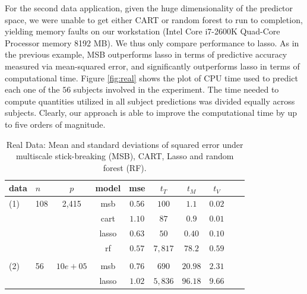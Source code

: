 \documentclass{article} %
\begin{document}
 For the second data application, given the huge dimensionality of the predictor space, we were unable to get either CART or random forest to run to completion, yielding memory faults on our workstation (Intel Core i7-2600K Quad-Core Processor memory 8192 MB).  We thus only compare performance to lasso.  As in the previous example, MSB outperforms lasso in terms of predictive accuracy measured via mean-squared error, and significantly outperforms lasso in terms of computational time.  
Figure \ref{fig:real} shows the plot of CPU time used to predict each one of the $56$ subjects involved in the experiment. The time needed to compute quantities utilized in all subject predictions was divided equally across subjects. Clearly, our approach is able to improve the computational time by up to five orders of magnitude. 


\begin{table}[t]
\caption{Real Data: Mean and standard deviations of squared error under multiscale stick-breaking (MSB), CART, Lasso and random forest (RF).}\label{real}
\vskip 0.15in
\begin{center}
\begin{small}
\begin{sc}
\begin{tabular}{llcccccccc}
\hline
data &$n$&$p$ &model&mse&$t_{T}$ & $t_{M}$ & $t_{V}$\\
\hline
(1)&108&2,415&msb &$0.56$ & $100$ & $1.1$& $0.02$\\
 &&& cart & $1.10$ & $87$ & $0.9$ &$0.01$\\
&&& lasso & $0.63$  & $50$ & $0.40$ & $0.10$\\
&&& rf & $0.57$ &  $7,817$ & $78.2$ & $0.59$\\
\\
  (2)&56&$10e+05$&msb &$0.76$ & $690$ & $20.98$& $2.31$\\
 &&& lasso & $1.02$  & $5,836$ & $96.18$ & $9.66$\\
\hline
\end{tabular}
\end{sc}
\end{small}
\end{center}
\vskip -0.1in
\end{table}


\nocite{langley00}
\end{document}
